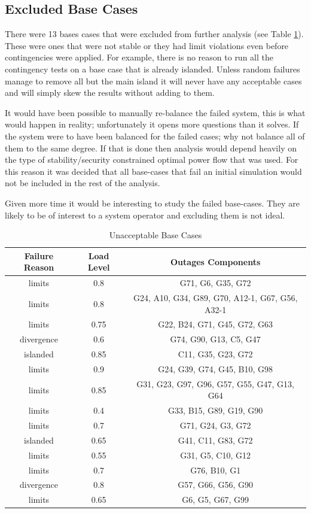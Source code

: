 \documentclass[a4paper,oneside,12pt]{report}
\begin{document}
\subsection{Excluded Base Cases} \label{section_excluded_bases}

There were 13 bases cases that were excluded from further analysis (see Table \ref{table_unacceptable_base_cases}). These were ones that were not stable or they had limit violations even before contingencies were applied. For example, there is no reason to run all the contingency tests on a base case that is already islanded. Unless random failures manage to remove all but the main island it will never have any acceptable cases and will simply skew the results without adding to them.

It would have been possible to manually re-balance the failed system, this is what would happen in reality; unfortunately it opens more questions than it solves. If the system were to have been balanced for the failed cases; why not balance all of them to the same degree. If that is done then analysis would depend heavily on the type of stability/security constrained optimal power flow that was used. For this reason it was decided that all base-cases that fail an initial simulation would not be included in the rest of the analysis.

Given more time it would be interesting to study the failed base-cases. They are likely to be of interest to a system operator and excluding them is not ideal.

\begin{table}[htbp]
\caption{Unacceptable Base Cases}
\label{table_unacceptable_base_cases}
\centering
\begin{tabular}{c||c||c}
\bfseries Failure Reason & \bfseries Load Level & \bfseries Outages Components \\
\hline \hline
limits &  0.8  &  G71, G6, G35, G72  \\ 
limits &  0.8  &  G24, A10, G34, G89, G70, A12-1, G67, G56, A32-1 \\ 
limits &  0.75 &  G22, B24, G71, G45, G72, G63 \\ 
divergence              &  0.6  &  G74, G90, G13, C5, G47 \\ 
islanded                &  0.85 &  C11, G35, G23, G72 \\ 
limits &  0.9  &  G24, G39, G74, G45, B10, G98 \\ 
limits &  0.85 &  G31, G23, G97, G96, G57, G55, G47, G13, G64 \\ 
limits &  0.4  &  G33, B15, G89, G19, G90 \\ 
limits &  0.7  &  G71, G24, G3, G72 \\ 
islanded                &  0.65 &  G41, C11, G83, G72 \\ 
limits &  0.55 &  G31, G5, C10, G12 \\ 
limits &  0.7  &  G76, B10, G1 \\ 
divergence              &  0.8  &  G57, G66, G56, G90 \\ 
limits &  0.65 &  G6, G5, G67, G99 \\ 
\hline
\end{tabular}\\
\end{table}
\end{document}
